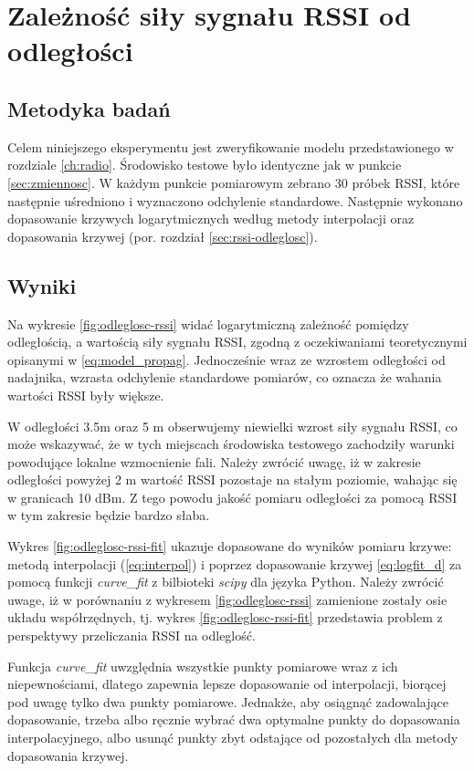 \section{Zależność siły sygnału RSSI od odległości}

\subsection{Metodyka badań}
Celem niniejszego eksperymentu jest zweryfikowanie modelu przedstawionego w rozdziale \ref{ch:radio}. Środowisko testowe było identyczne jak w punkcie \ref{sec:zmiennosc}. W każdym punkcie pomiarowym zebrano 30 próbek RSSI, które następnie uśredniono i wyznaczono odchylenie standardowe. Następnie wykonano dopasowanie krzywych logarytmicznych według metody interpolacji oraz dopasowania krzywej (por. rozdział \ref{sec:rssi-odleglosc}).

\subsection{Wyniki}

Na wykresie \ref{fig:odleglosc-rssi} widać logarytmiczną zależność pomiędzy odległością, a wartością siły sygnału RSSI, zgodną z oczekiwaniami teoretycznymi opisanymi w \ref{eq:model_propag}. Jednocześnie wraz ze wzrostem odległości od nadajnika, wzrasta odchylenie standardowe pomiarów, co oznacza że wahania wartości RSSI były większe. 

W odległości 3.5m oraz 5 m obserwujemy niewielki wzrost siły sygnału RSSI, co może wskazywać, że w tych miejscach środowiska testowego zachodziły warunki powodujące lokalne wzmocnienie fali. 
Należy zwrócić uwagę, iż w zakresie odległości powyżej 2 m wartość RSSI pozostaje na stałym poziomie, wahając się w granicach 10 dBm. Z tego powodu jakość pomiaru odległości za pomocą RSSI w tym zakresie będzie bardzo słaba. 

Wykres \ref{fig:odleglosc-rssi-fit} ukazuje dopasowane do wyników pomiaru krzywe: metodą interpolacji (\ref{eq:interpol}) i poprzez dopasowanie krzywej \ref{eq:logfit_d} za pomocą funkcji \textit{curve{\_}fit} z bilbioteki \textit{scipy} dla języka Python. Należy zwrócić uwage, iż w porównaniu z wykresem \ref{fig:odleglosc-rssi} zamienione zostały osie układu współrzędnych, tj. wykres \ref{fig:odleglosc-rssi-fit} przedstawia problem z perspektywy przeliczania RSSI na odleglość. 

Funkcja \textit{curve{\_}fit} uwzględnia wszystkie punkty pomiarowe wraz z ich niepewnościami, dlatego zapewnia lepsze dopasowanie od interpolacji, biorącej pod uwagę tylko dwa punkty pomiarowe. Jednakże, aby osiągnąć zadowalające dopasowanie, trzeba albo ręcznie wybrać dwa optymalne punkty do dopasowania interpolacyjnego, albo usunąć punkty zbyt odstające od pozostałych dla metody dopasowania krzywej. 

